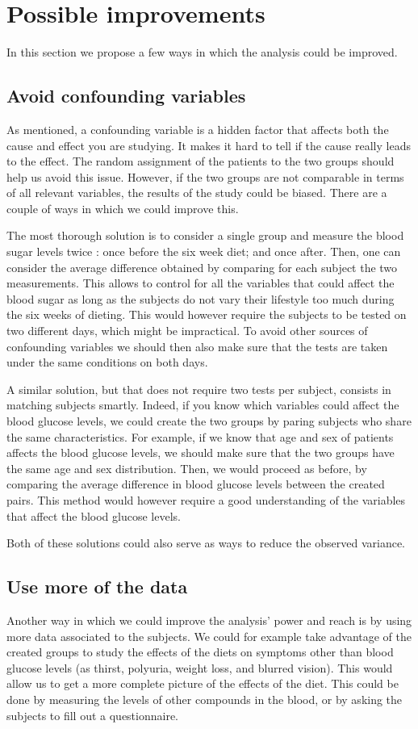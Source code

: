 \documentclass[a4paper, 12pt,oneside]{article}
\begin{document}
	\section{Possible improvements}
	In this section we propose a few ways in which the analysis could be improved.
	\subsection{Avoid confounding variables}
	As mentioned, a confounding variable is a hidden factor that affects both the cause and effect you are studying. It makes it hard to tell if the cause really leads to the effect. The random assignment of the patients to the two groups should help us avoid this issue. However, if the two groups are not comparable in terms of all relevant variables, the results of the study could be biased. There are a couple of ways in which we could improve this. 

	The most thorough solution is to consider a single group and measure the blood sugar levels twice : once before the six week diet; and once after. Then, one can consider the average difference obtained by comparing for each subject the two measurements. This allows to control for all the variables that could affect the blood sugar as long as the subjects do not vary their lifestyle too much during the six weeks of dieting. This would however require the subjects to be tested on two different days, which might be impractical. To avoid other sources of confounding variables we should then also make sure that the tests are taken under the same conditions on both days.

	A similar solution, but that does not require two tests per subject, consists in matching subjects smartly. Indeed, if you know which variables could affect the blood glucose levels, we could create the two groups by paring subjects who share the same characteristics. For example, if we know that age and sex of patients affects the blood glucose levels, we should make sure that the two groups have the same age and sex distribution. Then, we would proceed as before, by comparing the average difference in blood glucose levels between the created pairs. This method would however require a good understanding of the variables that affect the blood glucose levels.

	Both of these solutions could also serve as ways to reduce the observed variance.
	\subsection{Use more of the data}
	Another way in which we could improve the analysis' power and reach is by using more data associated to the subjects. We could for example take advantage of the created groups to study the effects of the diets on symptoms other than blood glucose levels (as thirst, polyuria, weight loss, and blurred vision). This would allow us to get a more complete picture of the effects of the diet. This could be done by measuring the levels of other compounds in the blood, or by asking the subjects to fill out a questionnaire. 
\end{document}
